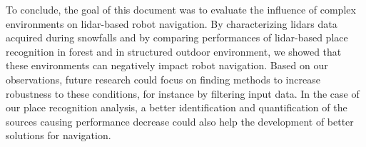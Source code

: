To conclude, the goal of this document was to evaluate the influence of complex environments on \gls*{lidar}-based robot navigation. By characterizing \gls*{lidar}s data acquired during snowfalls and by comparing performances of \gls*{lidar}-based place recognition in forest and in structured outdoor environment, we showed that these environments can negatively impact robot navigation. Based on our observations, future research could focus on finding methods to increase robustness to these conditions, for instance by filtering input data. In the case of our place recognition analysis, a better identification and quantification of the sources causing performance decrease could also help the development of better solutions for navigation.
